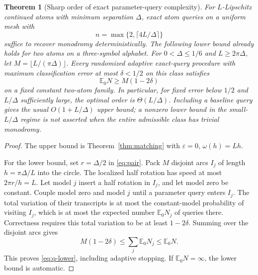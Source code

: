 \documentclass[11pt]{article}
\newtheorem{theorem}{Theorem}[section]
\theoremstyle{remark}\newtheorem{remark}[theorem]{Remark}
\begin{document}
\begin{theorem}[Sharp order of exact parameter-query complexity]\label{thm:lipschitz}
For $L$-Lipschitz continued atoms with minimum separation $\Delta$, exact atom queries on a uniform mesh with
\[
 n=\max\{2,\lceil4L/\Delta\rceil\}
\]
suffice to recover monodromy deterministically. The following lower bound already holds for two atoms on a three-symbol alphabet. For $0<\Delta\leq1/6$ and $L\geq2\pi\Delta$, let $M=\lfloor L/(\pi\Delta)\rfloor$. Every randomized adaptive exact-query procedure with maximum classification error at most $\delta<1/2$ on this class satisfies
\begin{equation}\label{eq:q-lower}
 \mathbb E_0 N\geq M(1-2\delta)
\end{equation}
on a fixed constant two-atom family. In particular, for fixed error below $1/2$ and $L/\Delta$ sufficiently large, the optimal order is $\Theta(L/\Delta)$. Including a baseline query gives the usual $O(1+L/\Delta)$ upper bound; a nonzero lower bound in the small-$L/\Delta$ regime is not asserted when the entire admissible class has trivial monodromy.
\end{theorem}
\begin{proof}
The upper bound is Theorem~\ref{thm:matching} with $\varepsilon=0$, $\omega(h)=Lh$.

For the lower bound, set $r=\Delta/2$ in \eqref{eq:pair}. Pack $M$ disjoint arcs $I_j$ of length $h=\pi\Delta/L$ into the circle. The localized half rotation has speed at most $2\pi r/h=L$. Let model $j$ insert a half rotation in $I_j$, and let model zero be constant. Couple model zero and model $j$ until a parameter query enters $I_j$. The total variation of their transcripts is at most the constant-model probability of visiting $I_j$, which is at most the expected number $\mathbb E_0N_j$ of queries there. Correctness requires this total variation to be at least $1-2\delta$. Summing over the disjoint arcs gives
\[
 M(1-2\delta)\leq\sum_j\mathbb E_0N_j\leq\mathbb E_0N.
\]
This proves \eqref{eq:q-lower}, including adaptive stopping. If $\mathbb E_0N=\infty$, the lower bound is automatic.
\end{proof}
\end{document}
